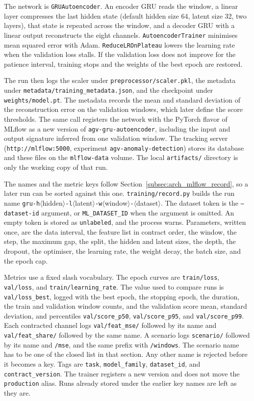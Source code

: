 The network is \texttt{GRUAutoencoder}. An encoder GRU reads the window, a linear layer compresses the last hidden state (default hidden size 64, latent size 32, two layers), that state is repeated across the window, and a decoder GRU with a linear output reconstructs the eight channels. \texttt{AutoencoderTrainer} minimises mean squared error with Adam. \texttt{ReduceLROnPlateau} lowers the learning rate when the validation loss stalls. If the validation loss does not improve for the patience interval, training stops and the weights of the best epoch are restored.

The run then logs the scaler under \texttt{preprocessor/scaler.pkl}, the metadata under \texttt{metadata/training\_metadata.json}, and the checkpoint under \texttt{weights/model.pt}. The metadata records the mean and standard deviation of the reconstruction error on the validation windows, which later define the score thresholds. The same call registers the network with the PyTorch flavor of MLflow as a new version of \texttt{agv-gru-autoencoder}, including the input and output signature inferred from one validation window. The tracking server (\texttt{http://mlflow:5000}, experiment \texttt{agv-anomaly-detection}) stores its database and these files on the \texttt{mlflow-data} volume. The local \texttt{artifacts/} directory is only the working copy of that run.

The names and the metric keys follow Section~\ref{subsec:arch_mlflow_record}, so a later run can be sorted against this one. \texttt{training/record.py} builds the run name \texttt{gru-h}$\langle$hidden$\rangle$\texttt{-l}$\langle$latent$\rangle$\texttt{-w}$\langle$window$\rangle$\texttt{-}$\langle$dataset$\rangle$. The dataset token is the \texttt{--dataset-id} argument, or \texttt{ML\_DATASET\_ID} when the argument is omitted. An empty token is stored as \texttt{unlabeled}, and the process warns. Parameters, written once, are the data interval, the feature list in contract order, the window, the step, the maximum gap, the split, the hidden and latent sizes, the depth, the dropout, the optimiser, the learning rate, the weight decay, the batch size, and the epoch cap.

Metrics use a fixed slash vocabulary. The epoch curves are \texttt{train/loss}, \texttt{val/loss}, and \texttt{train/learning\_rate}. The value used to compare runs is \texttt{val/loss\_best}, logged with the best epoch, the stopping epoch, the duration, the train and validation window counts, and the validation score mean, standard deviation, and percentiles \texttt{val/score\_p50}, \texttt{val/score\_p95}, and \texttt{val/score\_p99}. Each contracted channel logs \texttt{val/feat\_mse/} followed by its name and \texttt{val/feat\_share/} followed by the same name. A scenario logs \texttt{scenario/} followed by its name and \texttt{/mse}, and the same prefix with \texttt{/windows}. The scenario name has to be one of the closed list in that section. Any other name is rejected before it becomes a key. Tags are \texttt{task}, \texttt{model\_family}, \texttt{dataset\_id}, and \texttt{contract\_version}. The trainer registers a new version and does not move the \texttt{production} alias. Runs already stored under the earlier key names are left as they are.

